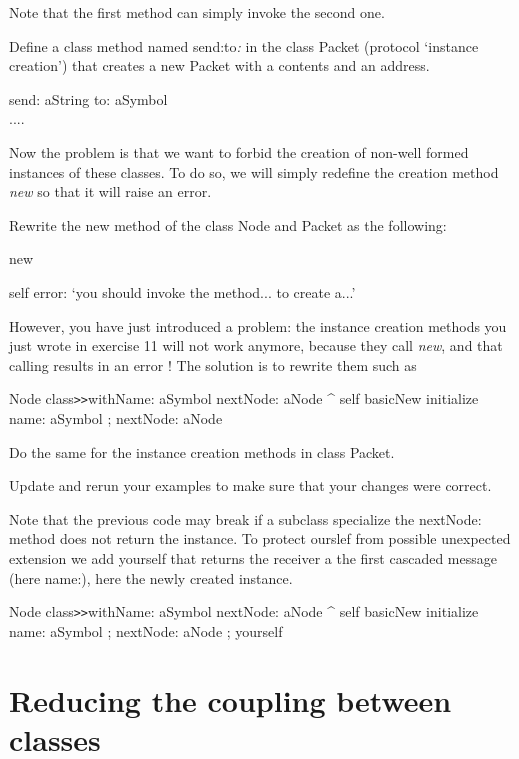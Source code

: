 Note that the first method can simply invoke the second one.

Define a class method named send:to\textit{:} in the class Packet (protocol `instance 
creation') that creates a new Packet with a contents and an address. 

\begin{code}
send: aString to: aSymbol\\
....
\end{code}

Now the problem is that we want to forbid the creation of non-well 
formed instances of these classes. To do so, we will simply redefine 
the creation method \textit{new} so that it will raise an error.

\exercise  Rewrite the new method of the class Node and Packet as 
the following:

\begin{code}
new

    self error: `you should invoke the method... to create a...' 
\end{code}

However, you have just introduced a problem: the instance creation 
methods you just wrote in exercise 11 will not work anymore, 
because they call \textit{new}, and that calling results in an error 
! The solution is to rewrite them such as 

\begin{code}
Node class\texttt{>>}withName: aSymbol nextNode: aNode
      ^ self basicNew initialize name: aSymbol ; nextNode: aNode
\end{code}

Do the same for the instance creation methods in class Packet.

\exercise Update and rerun your examples to make sure that 
your changes were correct.


Note that the previous code may break if a subclass specialize the nextNode: method
does not return the instance. To protect ourslef from possible unexpected
extension we add yourself that returns the receiver a the first cascaded message
(here name:), here the newly created instance. 

\begin{code}
Node class\texttt{>>}withName: aSymbol nextNode: aNode
      ^ self basicNew initialize name: aSymbol ; nextNode: aNode ; yourself
\end{code}


\section{Reducing the coupling between classes}


